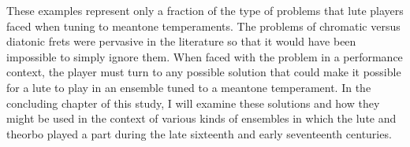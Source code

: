 These examples represent only a fraction of the type of problems that lute players
faced when tuning to meantone temperaments.  The problems of chromatic versus diatonic
frets were pervasive in the literature so that it would have been impossible to simply
ignore them.  When faced with the problem in a performance context, the player must
turn to any possible solution that could make it possible for a lute to play in an
ensemble tuned to a meantone temperament.  In the concluding chapter of this study,
I will examine these solutions and how they might be used in the context of various kinds
of ensembles in which the lute and theorbo played a part during the late sixteenth
and early seventeenth centuries.